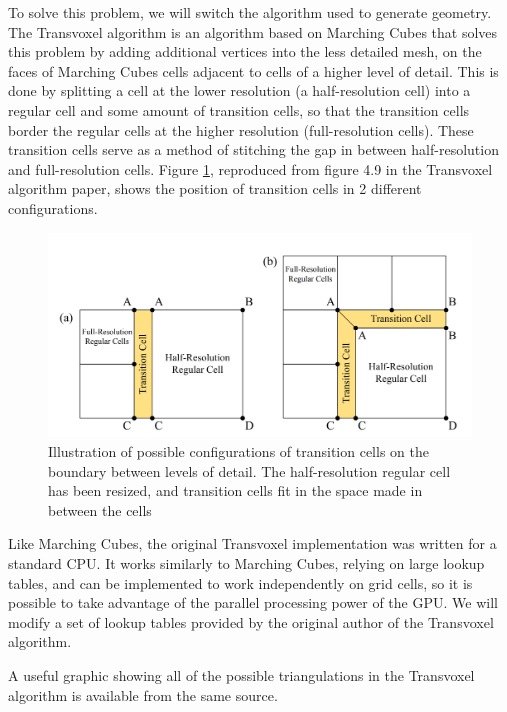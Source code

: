 \documentclass[11pt]{article}
\begin{document}
To solve this problem, we will switch the algorithm used to generate geometry. The Transvoxel algorithm \cite{lengyel_2010} is an algorithm based on Marching Cubes that solves this problem by adding additional vertices into the less detailed mesh, on the faces of Marching Cubes cells adjacent to cells of a higher level of detail. This is done by splitting a cell at the lower resolution (a half-resolution cell) into a regular cell and some amount of transition cells, so that the transition cells border the regular cells at the higher resolution (full-resolution cells). These transition cells serve as a method of stitching the gap in between half-resolution and full-resolution cells. Figure \ref{fig:transition_cells}, reproduced from figure 4.9 in the Transvoxel algorithm paper\cite{lengyel_2010}, shows the position of transition cells in 2 different configurations.
\begin{figure}[H]
  \includegraphics[width=\textwidth]{transition_cells}
  \caption{Illustration of possible configurations of transition cells on the boundary between levels of detail. The half-resolution regular cell has been resized, and transition cells fit in the space made in between the cells}
  \label{fig:transition_cells}
\end{figure}

Like Marching Cubes, the original Transvoxel implementation was written for a standard CPU. It works similarly to Marching Cubes, relying on large lookup tables, and can be implemented to work independently on grid cells, so it is possible to take advantage of the parallel processing power of the GPU. We will modify a set of lookup tables provided by the original author of the Transvoxel algorithm\cite{lengyel_2009}.

A useful graphic showing all of the possible triangulations in the Transvoxel algorithm is available from the same source\cite{lengyel}.
\end{document}
